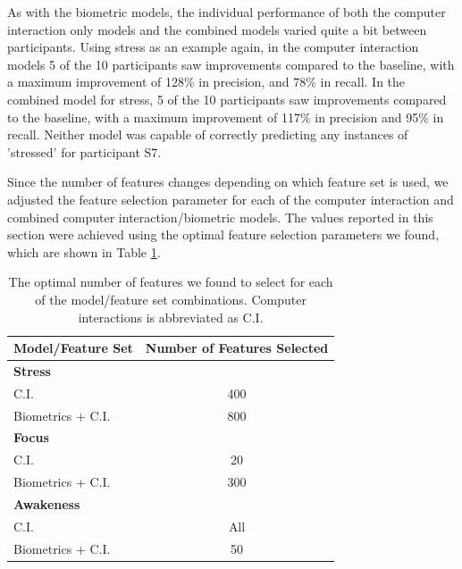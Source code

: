 As with the biometric models, the individual performance of both the computer interaction only models and the combined models varied quite a bit between participants. Using stress as an example again, in the computer interaction models 5 of the 10 participants saw improvements compared to the baseline, with a maximum improvement of 128\% in precision, and 78\% in recall. In the combined model for stress, 5 of the 10 participants saw improvements compared to the baseline, with a maximum improvement of 117\% in precision and 95\% in recall. Neither model was capable of correctly predicting any instances of 'stressed' for participant S7.

Since the number of features changes  depending on which feature set is used, we adjusted the feature selection parameter for each of the computer interaction and combined computer interaction/biometric models. The values reported in this section were achieved using the optimal feature selection parameters we found, which are shown in Table \ref{ciFeatureSelection}.

\begin{table}
\begin{center}
\begin{tabular}{lc}
\hline
Model/Feature Set & Number of Features Selected\\
\hline
\textbf{Stress}\\
\hspace{3mm}C.I. & 400\\
\hspace{3mm}Biometrics + C.I. & 800\\
\hline
\textbf{Focus}\\
\hspace{3mm}C.I. & 20\\
\hspace{3mm}Biometrics + C.I. & 300\\
\hline
\textbf{Awakeness}\\
\hspace{3mm}C.I. & All\\
\hspace{3mm}Biometrics + C.I. & 50\\
\hline
\end{tabular}
\caption{The optimal number of features we found to select for each of the model/feature set combinations. Computer interactions is abbreviated as C.I.}
\label{ciFeatureSelection}
\end{center}
\vspace*{-4mm}
\end{table}

